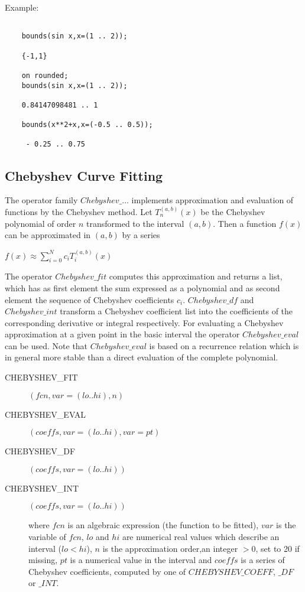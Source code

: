Example:

\begin{verbatim}

    bounds(sin x,x=(1 .. 2));

    {-1,1}

    on rounded;
    bounds(sin x,x=(1 .. 2));

    0.84147098481 .. 1

    bounds(x**2+x,x=(-0.5 .. 0.5));

     - 0.25 .. 0.75

\end{verbatim}

\subsection{Chebyshev Curve Fitting}

The operator family $Chebyshev\_\ldots$ implements approximation
and evaluation of functions by the Chebyshev method.
Let $T_n^{(a,b)}(x)$ be the Chebyshev polynomial of order $n$
transformed to the interval $(a,b)$. Then a function $f(x)$ can be
approximated in $(a,b)$ by a series

$f(x) \approx \sum_{i=0}^N c_i T_i^{(a,b)}(x)$

The operator $Chebyshev\_fit$ computes this approximation and
returns a list, which has as first element the sum expressed
as a polynomial and as second element the sequence
of Chebyshev coefficients ${c_i}$.
$Chebyshev\_df$ and $Chebyshev\_int$ transform a Chebyshev
coefficient list into the coefficients of the corresponding
derivative or integral respectively. For evaluating a Chebyshev
approximation at a given point in the basic interval the
operator $Chebyshev\_eval$ can be used. Note that
$Chebyshev\_eval$ is based on a recurrence relation which is
in general more stable than a direct evaluation of the
complete polynomial.

\begin{description}
\item[CHEBYSHEV\_FIT] $(fcn,var=(lo .. hi),n)$

\item[CHEBYSHEV\_EVAL] $(coeffs,var=(lo .. hi),var=pt)$

\item[CHEBYSHEV\_DF] $(coeffs,var=(lo .. hi))$

\item[CHEBYSHEV\_INT] $(coeffs,var=(lo .. hi))$

where $fcn$ is an algebraic expression (the function to be
fitted), $var$ is the variable of $fcn$, $lo$ and $hi$ are
numerical real values which describe an interval ($lo < hi$),
$n$ is the approximation order,an integer $>0$, set to 20 if missing,
$pt$ is a numerical value in the interval and $coeffs$ is
a series of Chebyshev coefficients, computed by one of
$CHEBYSHEV\_COEFF$, $\_DF$ or $\_INT$.
\end{description}

